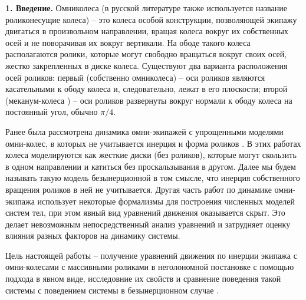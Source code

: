 {\bf 1. Введение.}
Омниколеса (в русской литературе также используется название роликонесущие колеса) -- это колеса особой конструкции, позволяющей экипажу двигаться в произвольном направлении, вращая колеса вокруг их собственных осей и не поворачивая их вокруг вертикали. На ободе такого колеса располагаются ролики, которые могут свободно вращаться вокруг своих осей, жестко закрепленных в диске колеса. Существуют два варианта расположения осей роликов: первый  (собственно омниколеса) -- оси роликов являются касательными к ободу колеса и, следовательно, лежат в его плоскости; второй (меканум-колеса \cite{mecanum}) -- оси роликов развернуты вокруг нормали к ободу колеса на постоянный угол, обычно $\pi/4$.

Ранее была рассмотрена динамика омни-экипажей с упрощенными моделями омни-колес, в которых не учитывается инерция и форма роликов \cite{ZobovaTatarinovPMM, formalskii, borisov, ZobovaTatarinovAspecty2006, zobova2008svobodnye8020851, Martynenko2010}. В этих работах колеса моделируются как жесткие диски (без роликов), которые могут скользить в одном направлении и катиться без проскальзывания в другом. Далее мы будем называть такую модель безынерционной в том смысле, что инерция собственного вращения роликов в ней не учитывается. Другая часть работ по динамике омни-экипажа \cite{KosenkoGerasimov, Tobolar, Williams2002, Ashmore2002} использует некоторые формализмы для построения численных моделей систем тел, при этом явный вид уравнений движения оказывается скрыт. Это делает невозможным непосредственный  анализ уравнений и затрудняет оценку влияния разных факторов на динамику системы.


Цель настоящей работы -- получение уравнений движения по инерции экипажа с омни-колесами с массивными роликами в неголономной постановке с помощью подхода \cite{Tatarinov} в явном виде, исследовние их свойств и сравнение поведения такой системы с поведением системы в безынерционном случае \cite{Zobova2011}.